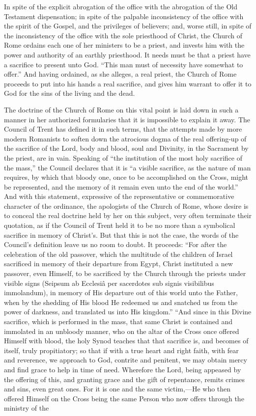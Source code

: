 \documentclass[]{book}
\begin{document}
In spite of the explicit abrogation of the office with the abrogation of the Old Testament dispensation; in spite of the palpable inconsistency of the office with the spirit of the Gospel, and the privileges of believers; and, worse still, in spite of the inconsistency of the office with the sole priesthood of Christ, the Church of Rome ordains each one of her ministers to be a priest, and invests him with the power and authority of an earthly priesthood. It needs must be that a priest have a sacrifice to present unto God. ``This man must of necessity have somewhat to offer.'' And having ordained, as she alleges, a real priest, the Church of Rome proceeds to put into his hands a real sacrifice, and gives him warrant to offer it to God for the sins of the living and the dead.

The doctrine of the Church of Rome on this vital point is laid down in such a manner in her authorized formularies that it is impossible to explain it away. The Council of Trent has defined it in such terms, that the attempts made by more modern Romanists to soften down the atrocious dogma of the real offering-up of the sacrifice of the Lord, body and blood, soul and Divinity, in the Sacrament by the priest, are in vain. Speaking of ``the institution of the most holy sacrifice of the mass,'' the Council declares that it is ``a visible sacrifice, as the nature of man requires, by which that bloody one, once to be accomplished on the Cross, might be represented, and the memory of it remain even unto the end of the world.'' And with this statement, expressive of the representative or commemorative character of the ordinance, the apologists of the Church of Rome, whose desire is to conceal the real doctrine held by her on this subject, very often terminate their quotation, as if the Council of Trent held it to be no more than a symbolical sacrifice in memory of Christ's. But that this is not the case, the words of the Council's definition leave us no room to doubt. It proceeds: ``For after the celebration of the old passover, which the multitude of the children of Israel sacrificed in memory of their departure from Egypt, Christ instituted a new passover, even Himself, to be sacrificed by the Church through the priests under visible signs (Seipsum ab Ecclesiâ per sacerdotes sub signis visibilibus immolandum), in memory of His departure out of this world unto the Father, when by the shedding of His blood He redeemed us and snatched us from the power of darkness, and translated us into His kingdom.'' ``And since in this Divine sacrifice, which is performed in the mass, that same Christ is contained and immolated in an unbloody manner, who on the altar of the Cross once offered Himself with blood, the holy Synod teaches that that sacrifice is, and becomes of itself, truly propitiatory; so that if with a true heart and right faith, with fear and reverence, we approach to God, contrite and penitent, we may obtain mercy and find grace to help in time of need. Wherefore the Lord, being appeased by the offering of this, and granting grace and the gift of repentance, remits crimes and sins, even great ones. For it is one and the same victim,---He who then offered Himself on the Cross being the same Person who now offers through the ministry of the 
\end{document}
